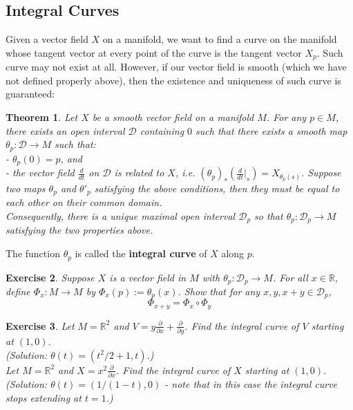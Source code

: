 \documentclass[11pt]{article}
\newtheorem{theorem}{Theorem}[section]
\newtheorem{exercise}[theorem]{Exercise}
\newcommand{\bb}[1]{\mathbb{#1}}
\newcommand{\mc}[1]{\mathcal{#1}}
\begin{document}
\subsection{Integral Curves}
Given a vector field $X$ on a manifold, we want to find a curve on the manifold whose tangent vector at every point of the curve is the tangent vector $X_p$. Such curve may not exist at all. However, if our vector field is smooth (which we have not defined properly above), then the existence and uniqueness of such curve is guaranteed:
\begin{theorem}\label{intcurve}
Let $X$ be a smooth vector field on a manifold $M$. For any $p \in M$, there exists an open interval $\mc{D}$ containing $0$ such that there exists a smooth map $\theta_p: \mc{D} \to M$ such that:\\
- $\theta_p(0) = p$, and\\
- the vector field $\frac{d}{dt}$ on $\mc{D}$ is related to $X$, i.e. $(\theta_p)_*(\frac{d}{dt}|_s) = X_{\theta_p(s)}$.
Suppose two maps $\theta_p$ and $\theta'_p$ satisfying the above conditions, then they must be equal to each other on their common domain.\\
Consequently, there is a unique maximal open interval $\mc{D}_p$ so that $\theta_p : \mc{D}_p \to M$ satisfying the two properties above.
\end{theorem}
The function $\theta_p$ is called the \textbf{integral curve} of $X$ along $p$.\\
\begin{exercise}
Suppose $X$ is a vector field in $M$ with $\theta_p: \mc{D}_p \to M$. For all $x \in \bb{R}$, define $\Phi_x : M \to M$ by $\Phi_x(p) := \theta_p(x)$. Show that for any $x, y, x+y \in \mc{D}_p$,
$$\Phi_{x+y} = \Phi_x \circ \Phi_y$$
\end{exercise}

\begin{exercise}
Let $M = \bb{R}^2$ and $V = y\frac{\partial}{\partial x}+ \frac{\partial}{\partial y}$. Find the integral curve of $V$ starting at $(1,0)$.\\
(Solution: $\theta(t) = (t^2/2 + 1, t)$.)\\
Let $M = \bb{R}^2$ and $X = x^2\frac{\partial}{\partial x}$. Find the integral curve of $X$ starting at $(1,0)$.\\
(Solution: $\theta(t) = (1/(1-t) , 0)$ - note that in this case the integral curve stops extending at $t = 1$.)
\end{exercise}
\end{document}
